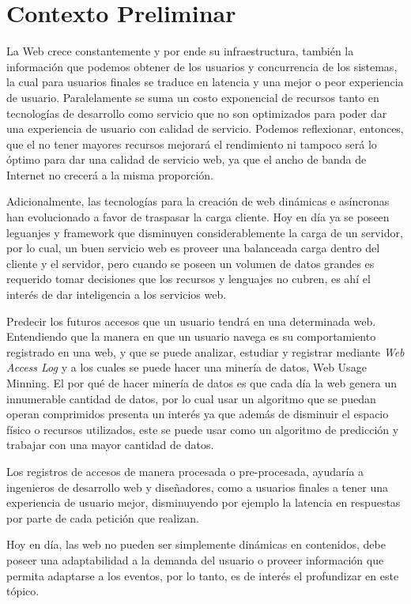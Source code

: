 \section{Contexto Preliminar} \label{sec:preliminar}

  La Web crece constantemente y por ende su infraestructura, también la información que podemos obtener de los  usuarios y  concurrencia de los sistemas, la cual para usuarios finales se traduce en latencia y una mejor o peor experiencia de usuario. Paralelamente se suma un costo exponencial de recursos tanto en tecnologías de desarrollo como servicio que no son optimizados para poder dar una experiencia de usuario con calidad de servicio. Podemos reflexionar, entonces, que el no tener mayores recursos mejorará el rendimiento ni tampoco será lo óptimo para dar una calidad de servicio web, ya que el ancho de banda de Internet no crecerá a la misma proporción.
   
  Adicionalmente, las tecnologías para la creación de web dinámicas e asíncronas han evolucionado a favor de traspasar la carga cliente.
  Hoy en día ya se poseen leguanjes y framework que disminuyen considerablemente la carga de un servidor, por lo cual, un buen servicio web es proveer una balanceada carga dentro del cliente y el servidor, pero cuando se poseen un volumen de datos grandes es requerido tomar decisiones que los recursos y lenguajes no cubren, es ahí el interés de dar inteligencia a los servicios web.

  Predecir los futuros accesos que un usuario tendrá en una determinada web. Entendiendo que la manera en que un usuario navega es su comportamiento registrado en una web, y que se puede analizar, estudiar y registrar mediante \emph{Web Access Log} y a los cuales se puede hacer una minería de datos, Web Usage Minning. El por qué de hacer minería de datos es que cada día la web genera un innumerable cantidad de datos, por lo cual usar un algoritmo que se puedan operan comprimidos presenta un interés ya que además de disminuir el espacio físico o recursos utilizados, este se puede usar como un algoritmo de predicción y trabajar con una mayor cantidad de datos.
  
  Los registros de accesos de manera procesada o pre-procesada, ayudaría a ingenieros de desarrollo web y diseñadores, como a  usuarios finales a tener una experiencia de usuario mejor, disminuyendo por ejemplo la latencia en respuestas por parte de cada petición que realizan.
  
  Hoy en día, las web no pueden ser simplemente dinámicas en contenidos, debe poseer una adaptabilidad a la demanda del usuario o proveer información que permita adaptarse a los eventos, por lo tanto, es de interés el profundizar en este tópico.

